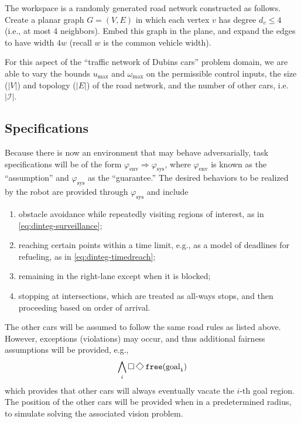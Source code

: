 \documentclass{amsart}
\theoremstyle{definition}
\begin{document}
The workspace is a randomly generated road network constructed as follows.
Create a planar graph $G = (V,E)$ in which each vertex $v$ has degree $d_v \le 4$
(i.e., at most 4 neighbors).  Embed this graph in the plane, and expand the
edges to have width $4w$ (recall $w$ is the common vehicle width).

For this aspect of the ``traffic network of Dubins cars'' problem domain, we are
able to vary the bounds $u_{\mathrm{max}}$ and $\omega_{\mathrm{max}}$ on the
permissible control inputs, the size ($|V|$) and topology ($|E|$) of the road
network, and the number of other cars, i.e. $|\mathcal I|$.


\subsection{Specifications}

Because there is now an environment that may behave adversarially, task
specifications will be of the form $\varphi_{\mathrm{env}} \Rightarrow
\varphi_{\mathrm{sys}}$, where $\varphi_{\mathrm{env}}$ is known as the
``assumption'' and $\varphi_{\mathrm{sys}}$ as the ``guarantee.''  The desired
behaviors to be realized by the robot are provided through
$\varphi_{\mathrm{sys}}$ and include
\begin{enumerate}
\item obstacle avoidance while repeatedly visiting regions of interest, as in
  \eqref{eq:dinteg-surveillance};

\item reaching certain points within a time limit, e.g., as a model of deadlines
  for refueling, as in \eqref{eq:dinteg-timedreach};

\item remaining in the right-lane except when it is blocked;

\item stopping at intersections, which are treated as all-ways stops, and then
  proceeding based on order of arrival.
\end{enumerate}
The other cars will be assumed to follow the same road rules as listed above.
However, exceptions (violations) may occur, and thus additional fairness
assumptions will be provided, e.g.,
\begin{equation}\label{eq:freegoals}
\bigwedge_i \Galways \Feventually \tt{free}(\mathrm{goal}_i)
\end{equation}
which provides that other cars will always eventually vacate the $i$-th goal
region. The position of the other cars will be provided when in a predetermined 
radius, to simulate solving the associated vision problem. 
\end{document}
